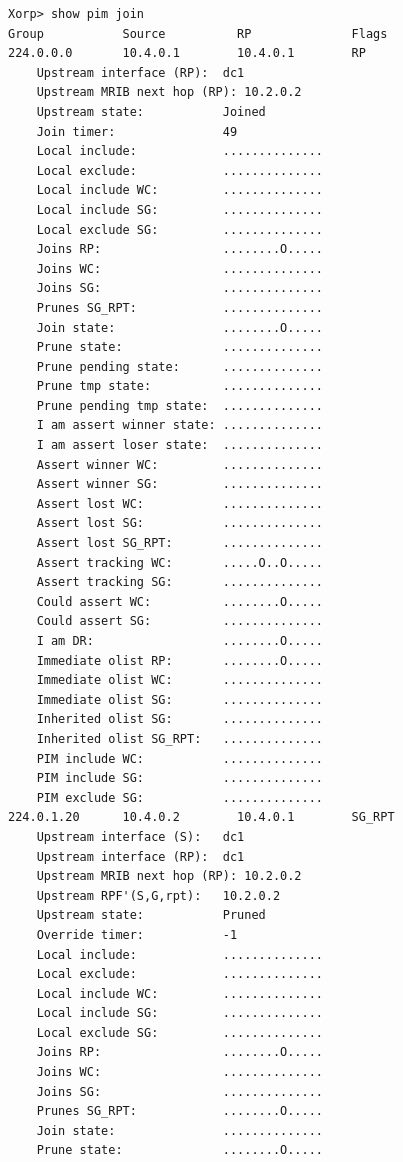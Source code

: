 \documentclass[11pt]{report}
\begin{document}
\begin{itemize}
\begin{verbatim}
Xorp> show pim join 
Group           Source          RP              Flags
224.0.0.0       10.4.0.1        10.4.0.1        RP   
    Upstream interface (RP):  dc1
    Upstream MRIB next hop (RP): 10.2.0.2
    Upstream state:           Joined 
    Join timer:               49
    Local include:            ..............
    Local exclude:            ..............
    Local include WC:         ..............
    Local include SG:         ..............
    Local exclude SG:         ..............
    Joins RP:                 ........O.....
    Joins WC:                 ..............
    Joins SG:                 ..............
    Prunes SG_RPT:            ..............
    Join state:               ........O.....
    Prune state:              ..............
    Prune pending state:      ..............
    Prune tmp state:          ..............
    Prune pending tmp state:  ..............
    I am assert winner state: ..............
    I am assert loser state:  ..............
    Assert winner WC:         ..............
    Assert winner SG:         ..............
    Assert lost WC:           ..............
    Assert lost SG:           ..............
    Assert lost SG_RPT:       ..............
    Assert tracking WC:       .....O..O.....
    Assert tracking SG:       ..............
    Could assert WC:          ........O.....
    Could assert SG:          ..............
    I am DR:                  ........O.....
    Immediate olist RP:       ........O.....
    Immediate olist WC:       ..............
    Immediate olist SG:       ..............
    Inherited olist SG:       ..............
    Inherited olist SG_RPT:   ..............
    PIM include WC:           ..............
    PIM include SG:           ..............
    PIM exclude SG:           ..............
224.0.1.20      10.4.0.2        10.4.0.1        SG_RPT 
    Upstream interface (S):   dc1
    Upstream interface (RP):  dc1
    Upstream MRIB next hop (RP): 10.2.0.2
    Upstream RPF'(S,G,rpt):   10.2.0.2
    Upstream state:           Pruned 
    Override timer:           -1
    Local include:            ..............
    Local exclude:            ..............
    Local include WC:         ..............
    Local include SG:         ..............
    Local exclude SG:         ..............
    Joins RP:                 ........O.....
    Joins WC:                 ..............
    Joins SG:                 ..............
    Prunes SG_RPT:            ........O.....
    Join state:               ..............
    Prune state:              ........O.....

\end{verbatim}
\end{itemize}
\end{document}
